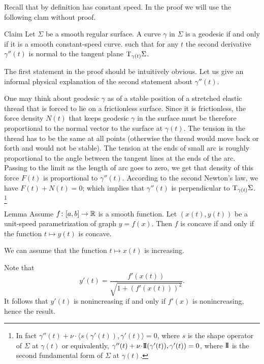 Recall that by definition has constant speed.
In the proof we will use the following clam without proof.

\begin{thm}{Claim}\label{clm:gamma''}
Let $\Sigma$ be a smooth regular surface.
A curve $\gamma$ in $\Sigma$ is a geodesic if and only if it is a smooth constant-speed curve.
such that  for any $t$ the second derivative $\gamma''(t)$ is normal to the tangent plane $\mathrm{T}_{\gamma(t)}\Sigma$.
\end{thm}

The first statement in the proof should be intuitively obvious.
Let us give an informal physical explanation of the second statement about $\gamma''(t)$.

One may think about geodesic $\gamma$ as of a stable position of a stretched elastic thread that is forced to lie on a frictionless surface.
Since it is frictionless, the force density $N(t)$ that keeps geodesic $\gamma$ in the surface must be therefore proportional to the normal vector to the surface at $\gamma(t)$.
The tension in the thread has to be the same at all points (otherwise the thread would move back or forth and would not be stable).
The tension at the ends of small arc is roughly proportional to the angle between the tangent lines at the ends of the arc. 
Passing to the limit as the length of arc goes to zero, we get that density of this force $F(t)$ is proportional to $\gamma''(t)$.
According to the second Newton's law, we have $F(t)+N(t)=0$;
which implies that  $\gamma''(t)$ is perpendicular to $\mathrm{T}_{\gamma(t)}\Sigma$.%
\footnote{In fact $\gamma''(t)+\nu\cdot \langle s(\gamma'(t)),\gamma'(t)\rangle=0$, where $s$ is the shape operator of $\Sigma$ at $\gamma(t)$ or equivalently,
$\gamma''(t)+\nu\cdot  \II(\gamma'(t)),\gamma'(t))=0$, where $\mathrm{I}\!\mathrm{I}$ is the second fundamental form of $\Sigma$ at $\gamma(t)$.}

\begin{thm}{Lemma}\label{lem:unit-speed} Assume $f\colon[a,b]\to\mathbb{R}$ is a smooth  function. 
Let $(x(t),y(t))$ be a unit-speed parametrization of graph $y=f(x)$.
Then $f$ is concave if and only if the function $t\mapsto y(t)$ is concave.
\end{thm}

We can assume that the function $t\mapsto x(t)$ is increasing.

Note that 
\[y'(t)=\frac{f'(x(t))}{\sqrt{1+(f'(x(t)))^2}}.\]
It follows that  $y'(t)$ is nonincreasing if and only if $f'(x)$ is nonincreasing, hence the result.
\qeds

